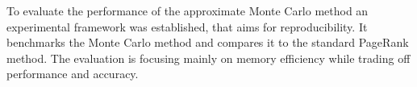 
To evaluate the performance of the approximate Monte Carlo method an experimental framework was established, that aims for reproducibility. It benchmarks the Monte Carlo method and compares it to the standard PageRank method. The evaluation is focusing mainly on memory efficiency while trading off performance and accuracy. \par



